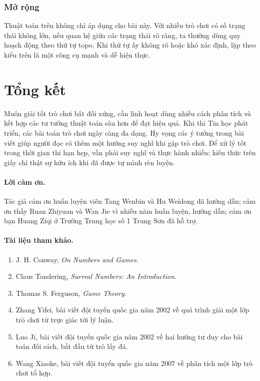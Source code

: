 \documentclass[11pt]{article}
\begin{document}
\subsubsection*{Mở rộng}

Thuật toán trên không chỉ áp dụng cho bài này. Với nhiều trò chơi có số trạng
thái không lớn, nếu quan hệ giữa các trạng thái rõ ràng, ta thường dùng quy
hoạch động theo thứ tự topo. Khi thứ tự ấy không rõ hoặc khó xác định, lặp
theo kiểu trên là một công cụ mạnh và dễ hiện thực.

\section{Tổng kết}

Muốn giải tốt trò chơi bất đối xứng, cần linh hoạt dùng nhiều cách phân tích
và kết hợp các tư tưởng thuật toán sâu hơn để đạt hiệu quả. Khi thi Tin học
phát triển, các bài toán trò chơi ngày càng đa dạng. Hy vọng các ý tưởng trong
bài viết giúp người đọc có thêm một hướng suy nghĩ khi gặp trò chơi. Để xử lý
tốt trong thời gian thi hạn hẹp, vẫn phải suy nghĩ và thực hành nhiều; kiến
thức trên giấy chỉ thật sự hữu ích khi đã được tự mình rèn luyện.

\paragraph{Lời cảm ơn.}
Tác giả cảm ơn huấn luyện viên Tang Wenbin và Hu Weidong đã hướng dẫn; cảm ơn
thầy Ruan Zhiyuan và Wan Jie vì nhiều năm huấn luyện, hướng dẫn; cảm ơn bạn
Huang Ziqi ở Trường Trung học số 1 Trung Sơn đã hỗ trợ.

\paragraph{Tài liệu tham khảo.}
\begin{enumerate}
  \item J. H. Conway, \emph{On Numbers and Games}.
  \item Claus Tondering, \emph{Surreal Numbers: An Introduction}.
  \item Thomas S. Ferguson, \emph{Game Theory}.
  \item Zhang Yifei, bài viết đội tuyển quốc gia năm 2002 về quá trình giải
  một lớp trò chơi từ trực giác tới lý luận.
  \item Luo Ji, bài viết đội tuyển quốc gia năm 2002 về hai hướng tư duy cho
  bài toán đối sách, bắt đầu từ trò lấy đá.
  \item Wang Xiaoke, bài viết đội tuyển quốc gia năm 2007 về phân tích một lớp
  trò chơi tổ hợp.
\end{enumerate}
\end{document}
